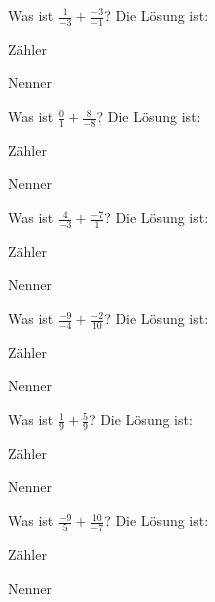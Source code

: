 \documentclass{ximera}
\begin{document}
\begin{shuffle}
\begin{question}
Was ist $\frac{1}{-3} + \frac{-3}{-1}$?
Die Lösung ist:
\begin{solution}
Zähler 
\end{solution}
\begin{solution}
Nenner 
\end{solution}
\end{question}


\begin{question}
Was ist $\frac{0}{1} + \frac{8}{-8}$?
Die Lösung ist:
\begin{solution}
Zähler 
\end{solution}
\begin{solution}
Nenner 
\end{solution}
\end{question}


\begin{question}
Was ist $\frac{4}{-3} + \frac{-7}{1}$?
Die Lösung ist:
\begin{solution}
Zähler 
\end{solution}
\begin{solution}
Nenner 
\end{solution}
\end{question}


\begin{question}
Was ist $\frac{-9}{-4} + \frac{-2}{10}$?
Die Lösung ist:
\begin{solution}
Zähler 
\end{solution}
\begin{solution}
Nenner 
\end{solution}
\end{question}


\begin{question}
Was ist $\frac{1}{9} + \frac{5}{9}$?
Die Lösung ist:
\begin{solution}
Zähler 
\end{solution}
\begin{solution}
Nenner 
\end{solution}
\end{question}


\begin{question}
Was ist $\frac{-9}{5} + \frac{10}{-7}$?
Die Lösung ist:
\begin{solution}
Zähler 
\end{solution}
\begin{solution}
Nenner 
\end{solution}
\end{question}



\end{shuffle}
\end{document}

